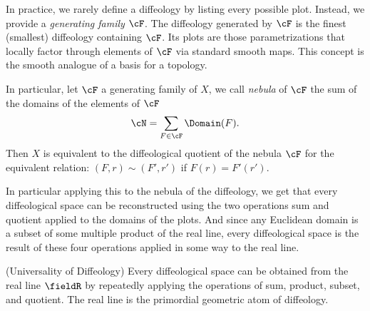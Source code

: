 \begin{article}
  In practice,
  we rarely define a diffeology by listing every possible plot.
  Instead,
  we provide a \emph{generating family} $\cF$.
  The diffeology generated by $\cF$ is the finest (smallest) diffeology containing $\cF$.
  Its plots are those parametrizations that locally factor through elements of $\cF$ via standard smooth maps.
  This concept is the smooth analogue of a basis for a topology.
  
  In particular,
  let $\cF$ a generating family of $X$,
  we call \emph{nebula} of $\cF$ the sum of the domains of the elements of $\cF$
  $$
    \cN = \sum_{F \in \cF} \Domain(F).
    $$%
  Then $X$ is equivalent to the diffeological quotient of the nebula $\cF$ for the equivalent relation:
  $(F,r) \sim (F',r')$ if $F(r) = F'(r')$.
  
  In particular applying this to the nebula of the diffeology,
  we get that every diffeological space can be reconstructed using the two operations sum and quotient applied to the domains of the plots.
  And since any Euclidean domain is a subset of some multiple product of the real line,
  every diffeological space is the result of these four operations applied in some way to the real line.
  
  \begin{proposition}\textup{(Universality of Diffeology)}
    Every diffeological space can be obtained from the real line $\fieldR$ by
    repeatedly applying the operations of sum, product, subset, and quotient.
    The real line is the primordial geometric atom of diffeology.
  \end{proposition}
\end{article}

